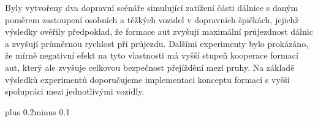 \documentclass[11pt,twoside,a4paper]{book}
\begin{document}
Byly vytvořeny dva dopravní scénáře simulující zatížení části dálnice s daným poměrem zastoupení osobních a těžkých vozidel v dopravních špičkách, jejichž výsledky ověřily předpoklad, že formace aut zvyšují maximální průjezdnost dálnic a zvyšují průměrnou rychlost při průjezdu. Dalšími experimenty bylo prokázáno, že mírně negativní efekt na tyto vlastnosti má vyšší stupeň kooperace formací aut, který ale zvyšuje celkovou bezpečnost přejíždění mezi pruhy. Na základě výsledků experimentů doporučujeme implementaci konceptu formací s vyšší spolupráci mezi jednotlivými vozidly.

\noindent



\tableofcontents



\listoffigures



\listoftables



\mainbodystarts
\normalfont
{}\baselineskip plus 0.2\baselineskip minus 0.1\baselineskip



% 
% 



 

 

 

 

 
\end{document}
